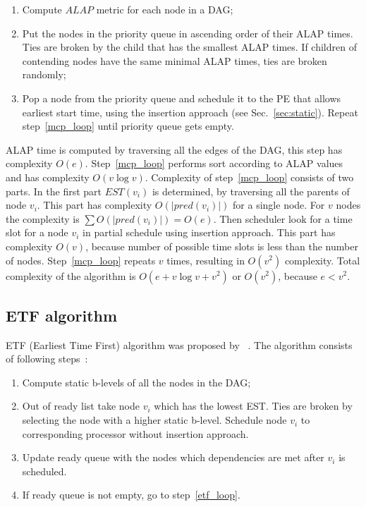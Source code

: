 \begin{enumerate}
\item Compute $ALAP$ metric for each node in a DAG;
\item \label{mcp_sort}Put the nodes in the priority queue in ascending order of their
  ALAP times. Ties are broken by the child that has the smallest ALAP
  times. If children of contending nodes have the same minimal ALAP
  times, ties are broken randomly;
\item \label{mcp_loop} Pop a node from the priority queue and schedule
  it to the PE that allows earliest start time, using the insertion
  approach (see Sec.~\ref{sec:static}). Repeat step~\ref{mcp_loop}
  until priority queue gets empty.
\end{enumerate}

ALAP time is computed by traversing all the edges of the DAG, this
step has complexity $O(e)$. Step~\ref{mcp_loop} performs sort
according to ALAP values and has complexity $O(v \log{v})$. Complexity
of step~\ref{mcp_loop} consists of two parts. In the first part
$EST(v_i)$ is determined, by traversing all the parents of node
$v_i$. This part has complexity $O(\left|pred(v_i)\right|)$ for a
single node. For $v$ nodes the complexity is
$\sum O(\left|pred(v_i)\right|) = O(e)$. Then scheduler look for a
time slot for a node $v_i$ in partial schedule using insertion
approach. This part has complexity $O(v)$, because number of possible
time slots is less than the number of nodes. Step~\ref{mcp_loop}
repeats $v$ times, resulting in $O(v^2)$ complexity. Total complexity
of the algorithm is $O(e + v\log v + v^2)$ or $O(v^2)$, because
$e < v^2$.


\subsection{ETF algorithm}
\label{sec:eft}

ETF (Earliest Time First) algorithm was proposed by
\citeauthor{hwang1989scheduling}~\cite{hwang1989scheduling}. The
algorithm consists of following steps~\cite{kwok1999static}:

\begin{enumerate}
\item Compute static b-levels of all the nodes in the DAG;
\item \label{etf_loop} Out of ready list take node $v_i$ which has the
  lowest EST. Ties are broken by selecting the node with a higher
  static b-level. Schedule node $v_i$ to corresponding processor
  without insertion approach.
\item Update ready queue with the nodes which dependencies are met
  after $v_i$ is scheduled.
\item If ready queue is not empty, go to step~\ref{etf_loop}.
\end{enumerate}

